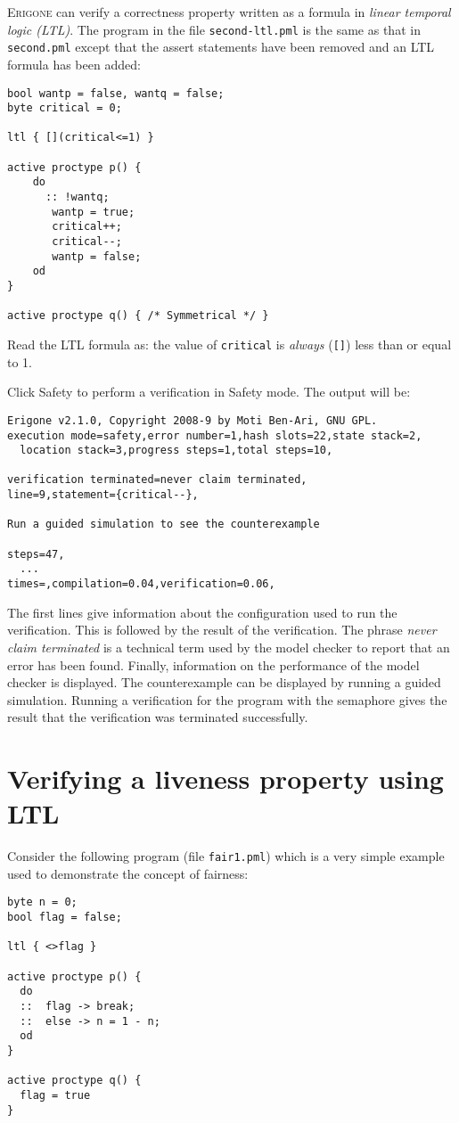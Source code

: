 \documentclass[11pt]{article}
\newcommand*{\prg}{\textsc{Erigone}}
\newcommand*{\p}[1]{\texttt{#1}}
\newcommand*{\bu}[1]{\textsf{#1}}
\begin{document}
\prg{} can verify a correctness property written as a formula in
\emph{linear temporal logic (LTL)}.
The program in the file \p{second-ltl.pml} is the same as that in
\p{second.pml} except that the assert statements have been removed
and an LTL formula has been added:
\begin{verbatim}
bool wantp = false, wantq = false;
byte critical = 0;

ltl { [](critical<=1) }

active proctype p() {
    do 
	  :: !wantq;
       wantp = true;
       critical++;
       critical--;
       wantp = false;
    od
}

active proctype q() { /* Symmetrical */ }
\end{verbatim}
Read the LTL formula as: the value of \p{critical} is \emph{always}
(\p{[]}) less than or equal to 1.

Click \bu{Safety} to perform a verification in Safety mode. The output
will be:

\begin{verbatim}
Erigone v2.1.0, Copyright 2008-9 by Moti Ben-Ari, GNU GPL.
execution mode=safety,error number=1,hash slots=22,state stack=2,
  location stack=3,progress steps=1,total steps=10,

verification terminated=never claim terminated,
line=9,statement={critical--},

Run a guided simulation to see the counterexample

steps=47,
  ...
times=,compilation=0.04,verification=0.06,
\end{verbatim}

The first lines give information about the configuration used to run the
verification. This is followed by the result of the verification. The
phrase \emph{never claim terminated} is a technical term used by the
model checker to report that an error has been found. Finally,
information on the performance of the model checker is displayed. The
counterexample can be displayed by running a guided simulation.
Running a verification for the program with the semaphore gives the
result that the verification was terminated successfully.

\section{Verifying a liveness property using LTL}

Consider the following program (file \p{fair1.pml}) which is a very
simple example used to demonstrate the concept of fairness:
\begin{verbatim}
byte n = 0;
bool flag = false;

ltl { <>flag }

active proctype p() {
  do
  ::  flag -> break;
  ::  else -> n = 1 - n;
  od
}

active proctype q() {
  flag = true
}
\end{verbatim}
\end{document}
